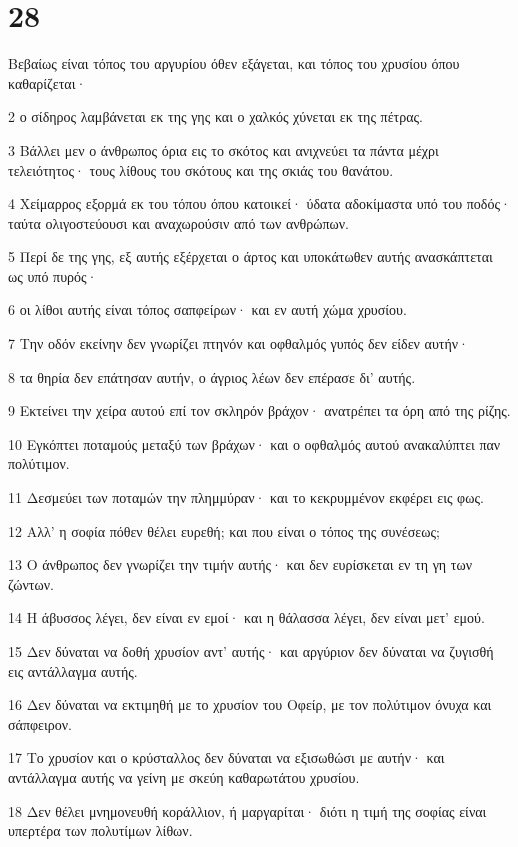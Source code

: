 \chapter{28}

\par Βεβαίως είναι τόπος του αργυρίου όθεν εξάγεται, και τόπος του χρυσίου όπου καθαρίζεται·
\par 2 ο σίδηρος λαμβάνεται εκ της γης και ο χαλκός χύνεται εκ της πέτρας.
\par 3 Βάλλει μεν ο άνθρωπος όρια εις το σκότος και ανιχνεύει τα πάντα μέχρι τελειότητος· τους λίθους του σκότους και της σκιάς του θανάτου.
\par 4 Χείμαρρος εξορμά εκ του τόπου όπου κατοικεί· ύδατα αδοκίμαστα υπό του ποδός· ταύτα ολιγοστεύουσι και αναχωρούσιν από των ανθρώπων.
\par 5 Περί δε της γης, εξ αυτής εξέρχεται ο άρτος και υποκάτωθεν αυτής ανασκάπτεται ως υπό πυρός·
\par 6 οι λίθοι αυτής είναι τόπος σαπφείρων· και εν αυτή χώμα χρυσίου.
\par 7 Την οδόν εκείνην δεν γνωρίζει πτηνόν και οφθαλμός γυπός δεν είδεν αυτήν·
\par 8 τα θηρία δεν επάτησαν αυτήν, ο άγριος λέων δεν επέρασε δι' αυτής.
\par 9 Εκτείνει την χείρα αυτού επί τον σκληρόν βράχον· ανατρέπει τα όρη από της ρίζης.
\par 10 Εγκόπτει ποταμούς μεταξύ των βράχων· και ο οφθαλμός αυτού ανακαλύπτει παν πολύτιμον.
\par 11 Δεσμεύει των ποταμών την πλημμύραν· και το κεκρυμμένον εκφέρει εις φως.
\par 12 Αλλ' η σοφία πόθεν θέλει ευρεθή; και που είναι ο τόπος της συνέσεως;
\par 13 Ο άνθρωπος δεν γνωρίζει την τιμήν αυτής· και δεν ευρίσκεται εν τη γη των ζώντων.
\par 14 Η άβυσσος λέγει, δεν είναι εν εμοί· και η θάλασσα λέγει, δεν είναι μετ' εμού.
\par 15 Δεν δύναται να δοθή χρυσίον αντ' αυτής· και αργύριον δεν δύναται να ζυγισθή εις αντάλλαγμα αυτής.
\par 16 Δεν δύναται να εκτιμηθή με το χρυσίον του Οφείρ, με τον πολύτιμον όνυχα και σάπφειρον.
\par 17 Το χρυσίον και ο κρύσταλλος δεν δύναται να εξισωθώσι με αυτήν· και αντάλλαγμα αυτής να γείνη με σκεύη καθαρωτάτου χρυσίου.
\par 18 Δεν θέλει μνημονευθή κοράλλιον, ή μαργαρίται· διότι η τιμή της σοφίας είναι υπερτέρα των πολυτίμων λίθων.

